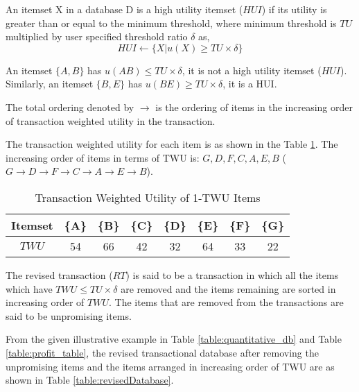\documentclass[11pt,openright]{report}
\begin{document}
\begin{definition}
	An itemset X in a database D is a high utility itemset ($HUI$) if its utility is greater than or equal to the minimum threshold, where minimum threshold is $TU$ multiplied by user specified threshold ratio $\delta$ as,
	\begin{equation}
	HUI \gets \{X|u(X) \ge TU \times \delta \} \label{eq:hui}
	\end{equation}
\end{definition}
An itemset $\{A,B\}$ has $u(AB) \le TU \times \delta$, it is not a high utility itemset ($HUI$). Similarly, an itemset $\{B,E\}$ has $u(BE) \ge TU \times \delta$, it is a HUI.

\begin{definition}
	\label{def:total_ordering}
	The total ordering denoted by $\rightarrow$ is the ordering of items in the increasing order of transaction weighted utility in the transaction. 	
\end{definition}
The transaction weighted utility for each item is as shown in the Table \ref{table:twu_items}. The increasing order of items in terms of TWU is: $G, D, F, C, A, E, B$ ($G \rightarrow D \rightarrow F \rightarrow C \rightarrow A \rightarrow E \rightarrow B$).

\begin{table}
	\renewcommand{\arraystretch}{1.3}
	\caption{Transaction Weighted Utility of 1-TWU Items}
	\label{table:twu_items}
	\centering
	\begin{tabular}{|c||c|c|c|c|c|c|c|}
		\hline
		\bfseries Itemset & \bfseries \{A\} & \bfseries \{B\} & \bfseries \{C\} & \bfseries \{D\} & \bfseries \{E\} & \bfseries \{F\} & \bfseries \{G\}\\
		\hline
		$TWU$ & 54 & 66 & 42 & 32 & 64 & 33 & 22\\ \hline
	\end{tabular}
\end{table}

\begin{definition}
	The revised transaction ($RT$) is said to be a transaction in which all the items which have $TWU \le TU \times \delta$ are removed and the items remaining are sorted in increasing order of $TWU$. The items that are removed from the transactions are said to be unpromising items.
\end{definition}
From the given illustrative example in Table \ref{table:quantitative_db} and Table \ref{table:profit_table}, the revised transactional database after removing the unpromising items and the items arranged in increasing order of TWU are as shown in Table \ref{table:revisedDatabase}.
\end{document}
